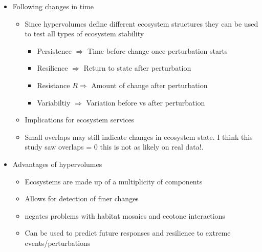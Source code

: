 \documentclass[11pt]{article}
\begin{document}
\begin{itemize}
\begin{itemize}
			\item Following changes in time
			\begin{itemize}
				\item Since hypervolumes define different ecosystem structures they can be used to test all types of ecosystem stability
				\begin{itemize}
					\item Persistence $\Rightarrow$ Time before change once perturbation starts
					\item Resilience $\Rightarrow$ Return to state after perturbation
					\item Resistance $R\Rightarrow$ Amount of change after perturbation
					\item Variabiltiy $\Rightarrow$ Variation before vs after perturbation
				\end{itemize}
				\item Implications for ecosystem services
				\item Small overlaps may still indicate changes in ecosystem state. I think this study saw overlaps = 0 this is not as likely on real data!. 
			\end{itemize}
		
			\item Advantages of hypervolumes
			\begin{itemize}
				\item Ecosystems are made up of a multiplicity of components
				\item Allows for detection of finer changes
				\item negates problems with habitat mosaics and ecotone interactions
				\item Can be used to predict future responses and resilience to extreme events/perturbations
			\end{itemize}
		\end{itemize}

	\end{itemize}
	
		
	
	
\end{document}
